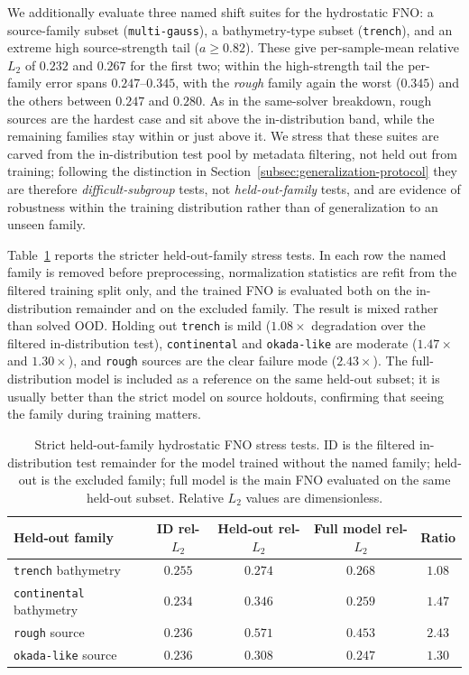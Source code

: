 We additionally evaluate three named shift suites for the hydrostatic FNO: a source-family subset (\texttt{multi-gauss}), a bathymetry-type subset (\texttt{trench}), and an extreme high source-strength tail ($a \ge 0.82$). These give per-sample-mean relative $L_2$ of $0.232$ and $0.267$ for the first two; within the high-strength tail the per-family error spans $0.247$--$0.345$, with the \emph{rough} family again the worst ($0.345$) and the others between $0.247$ and $0.280$. As in the same-solver breakdown, rough sources are the hardest case and sit above the in-distribution band, while the remaining families stay within or just above it. We stress that these suites are carved from the in-distribution test pool by metadata filtering, not held out from training; following the distinction in Section~\ref{subsec:generalization-protocol} they are therefore \emph{difficult-subgroup} tests, not \emph{held-out-family} tests, and are evidence of robustness within the training distribution rather than of generalization to an unseen family.

Table~\ref{tab:strict-holdout} reports the stricter held-out-family stress tests. In each row the named family is removed before preprocessing, normalization statistics are refit from the filtered training split only, and the trained FNO is evaluated both on the in-distribution remainder and on the excluded family. The result is mixed rather than solved OOD. Holding out \texttt{trench} is mild ($1.08 \times$ degradation over the filtered in-distribution test), \texttt{continental} and \texttt{okada-like} are moderate ($1.47 \times$ and $1.30 \times$), and \texttt{rough} sources are the clear failure mode ($2.43 \times$). The full-distribution model is included as a reference on the same held-out subset; it is usually better than the strict model on source holdouts, confirming that seeing the family during training matters.

\begin{table}[!htbp]
\centering
\caption{Strict held-out-family hydrostatic FNO stress tests. ID is the filtered in-distribution test remainder for the model trained without the named family; held-out is the excluded family; full model is the main FNO evaluated on the same held-out subset. Relative $L_2$ values are dimensionless.}
\label{tab:strict-holdout}
\begin{tabular}{lcccc}
    \toprule
    Held-out family & ID rel-$L_2$ & Held-out rel-$L_2$ & Full model rel-$L_2$ & Ratio \\
    \midrule
    \texttt{trench} bathymetry      & $0.255$ & $0.274$ & $0.268$ & $1.08$ \\
    \texttt{continental} bathymetry & $0.234$ & $0.346$ & $0.259$ & $1.47$ \\
    \texttt{rough} source           & $0.236$ & $0.571$ & $0.453$ & $2.43$ \\
    \texttt{okada-like} source      & $0.236$ & $0.308$ & $0.247$ & $1.30$ \\
    \bottomrule
\end{tabular}
\end{table}

